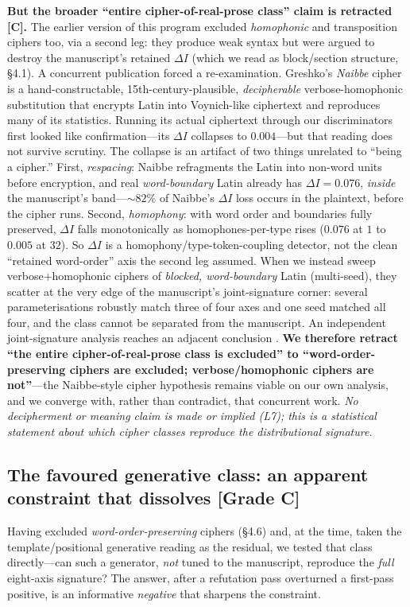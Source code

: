 \documentclass[11pt]{article}
\newcommand{\grade}[1]{{\small\textbf{[#1]}}}
\begin{document}
\textbf{But the broader ``entire cipher-of-real-prose class'' claim is retracted \grade{C}.}
The earlier version of this program excluded \emph{homophonic} and transposition ciphers too,
via a second leg: they produce weak syntax but were argued to destroy the manuscript's
retained $\Delta I$ (which we read as block/section structure, \S4.1). A concurrent
publication forced a re-examination. Greshko's \emph{Naibbe} cipher \citep{greshko2025naibbe}
is a hand-constructable, 15th-century-plausible, \emph{decipherable} verbose-homophonic
substitution that encrypts Latin into Voynich-like ciphertext and reproduces many of its
statistics. Running its actual ciphertext through our discriminators first looked like
confirmation---its $\Delta I$ collapses to $0.004$---but that reading does not survive scrutiny.
The collapse is an artifact of two things unrelated to ``being a cipher.'' First,
\emph{respacing}: Naibbe refragments the Latin into non-word units before encryption, and
real \emph{word-boundary} Latin already has $\Delta I=0.076$, \emph{inside} the manuscript's
band---$\sim\!82\%$ of Naibbe's $\Delta I$ loss occurs in the plaintext, before the cipher runs.
Second, \emph{homophony}: with word order and boundaries fully preserved, $\Delta I$ falls
monotonically as homophones-per-type rises ($0.076$ at $1$ to $0.005$ at $32$). So $\Delta I$
is a homophony/type-token-coupling detector, not the clean ``retained word-order'' axis the
second leg assumed. When we instead sweep verbose$+$homophonic ciphers of \emph{blocked,
word-boundary} Latin (multi-seed), they scatter at the very edge of the manuscript's
joint-signature corner: several parameterisations robustly match three of four axes and one
seed matched all four, and the class cannot be separated from the manuscript. An independent
joint-signature analysis reaches an adjacent conclusion \citep{parisel2026layered}.
\textbf{We therefore retract ``the entire cipher-of-real-prose class is excluded'' to
``word-order-preserving ciphers are excluded; verbose/homophonic ciphers are not''}---the
Naibbe-style cipher hypothesis remains viable on our own analysis, and we converge with,
rather than contradict, that concurrent work. \emph{No decipherment or meaning claim is made
or implied (L7); this is a statistical statement about which cipher classes reproduce the
distributional signature.}

\subsection{The favoured generative class: an apparent constraint that dissolves \grade{Grade C}}
Having excluded \emph{word-order-preserving} ciphers (\S4.6) and, at the time, taken the
template/positional generative reading as the residual, we tested that class
directly---can such a generator, \emph{not}
tuned to the manuscript, reproduce the \emph{full} eight-axis signature? The answer,
after a refutation pass overturned a first-pass positive, is an informative
\emph{negative} that sharpens the constraint.
\end{document}
